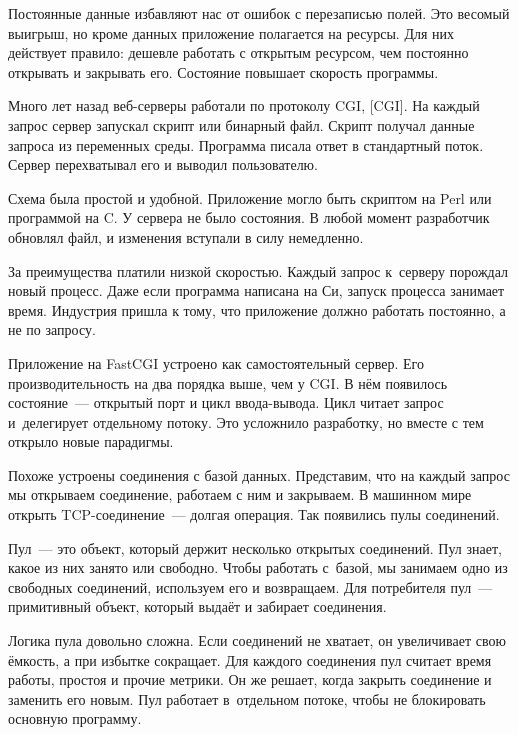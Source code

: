 
Постоянные данные избавляют нас от ошибок с перезаписью полей. Это весомый
выигрыш, но кроме данных приложение полагается на ресурсы. Для них действует
правило: дешевле работать с открытым ресурсом, чем постоянно открывать и
закрывать его. Состояние повышает скорость программы.


Много лет назад веб-серверы работали по протоколу CGI,
[CGI].
На каждый запрос сервер запускал скрипт или бинарный файл. Скрипт получал данные
запроса из переменных среды. Программа писала ответ в стандартный поток. Сервер
перехватывал его и выводил пользователю.

Схема была простой и удобной. Приложение могло быть скриптом на Perl или
программой на C\Plus\Plus. У сервера не было состояния. В любой момент
разработчик обновлял файл, и изменения вступали в силу немедленно.

За преимущества платили низкой скоростью. Каждый запрос к~серверу порождал новый
процесс. Даже если программа написана на Си, запуск процесса занимает
время. Индустрия пришла к тому, что приложение должно работать постоянно, а не
по запросу.


Приложение на FastCGI устроено как самостоятельный сервер. Его
производительность на два порядка выше, чем у CGI. В нём появилось состояние~---
открытый порт и цикл ввода-вывода. Цикл читает запрос и~делегирует отдельному
потоку. Это усложнило разработку, но вместе с тем открыло новые парадигмы.

Похоже устроены соединения с базой данных. Представим, что на каждый запрос мы
открываем соединение, работаем с ним и закрываем. В машинном мире открыть
TCP-соединение~--- долгая операция. Так появились пулы соединений.


Пул~--- это объект, который держит несколько открытых соединений. Пул знает,
какое из них занято или свободно. Чтобы работать с~базой, мы занимаем одно из
свободных соединений, используем его и возвращаем. Для потребителя пул~---
примитивный объект, который выдаёт и забирает соединения.

Логика пула довольно сложна. Если соединений не хватает, он увеличивает свою
ёмкость, а при избытке сокращает. Для каждого соединения пул считает время
работы, простоя и прочие метрики. Он же решает, когда закрыть соединение и
заменить его новым. Пул работает в~отдельном потоке, чтобы не блокировать
основную программу.

